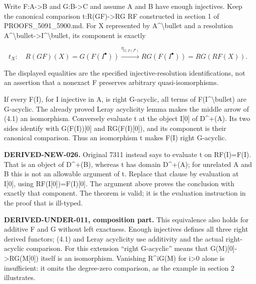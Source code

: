 \documentclass[11pt]{article}
\begin{document}
Write F:\allowbreak{}A\allowbreak{}->B and G:\allowbreak{}B\allowbreak{}->C and assume A and B have enough injectives. Keep the canonical comparison t:\allowbreak{}R(GF)\allowbreak{}\allowbreak{}->RG RF constructed in section 1 of PROOFS\_\allowbreak{}5091\_\allowbreak{}5900.md. For X represented by A\^{}\textbackslash bullet and a resolution A\textasciicircum{}\textbackslash{}bullet\allowbreak{}->I\textasciicircum{}\textbackslash{}bullet,\allowbreak{} its component is exactly

\[
 t_X:\quad
 R(GF)(X)=G(F(I^\bullet))
       \xrightarrow{\eta_{G,F(I^\bullet)}}RG(F(I^\bullet))
       =RG(RF(X)).                                            \tag{4.1}
\]

The displayed equalities are the specified injective-resolution identifications,\allowbreak{} not an assertion that a nonexact F preserves arbitrary quasi-isomorphisms.

If every F(I)\allowbreak{},\allowbreak{} for I injective in A,\allowbreak{} is right G-acyclic,\allowbreak{} all terms of F(I\textasciicircum{}\textbackslash{}bullet)\allowbreak{} are G-acyclic. The already proved Leray acyclicity lemma makes the middle arrow of (4.1)\allowbreak{} an isomorphism. Conversely evaluate t at the object I[0]\allowbreak{} of D\textasciicircum{}\allowbreak{}+(A)\allowbreak{}. Its two sides identify with G(F(I)\allowbreak{})\allowbreak{}[0]\allowbreak{} and RG(F(I)\allowbreak{}[0]\allowbreak{})\allowbreak{},\allowbreak{} and its component is their canonical comparison. Thus an isomorphism t makes F(I)\allowbreak{} right G-acyclic.

\textbf{DERIVED-NEW-026.} Original 7311 instead says to evaluate t on RF(I)\allowbreak{}\allowbreak{}=F(I)\allowbreak{}. That is an object of D\textasciicircum{}\allowbreak{}+(B)\allowbreak{},\allowbreak{} whereas t has domain D\textasciicircum{}\allowbreak{}+(A)\allowbreak{}; for unrelated A and B this is not an allowable argument of t. Replace that clause by evaluation at I[0]\allowbreak{},\allowbreak{} using RF(I[0]\allowbreak{})\allowbreak{}\allowbreak{}=F(I)\allowbreak{}[0]\allowbreak{}. The argument above proves the conclusion with exactly that component. The theorem is valid; it is the evaluation instruction in the proof that is ill-typed.

\textbf{DERIVED-UNDER-011,\allowbreak{} composition part.} This equivalence also holds for additive F and G without left exactness. Enough injectives defines all three right derived functors; (4.1)\allowbreak{} and Leray acyclicity use additivity and the actual right-acyclic comparison. For this extension ``right G-acyclic'' means that G(M)\allowbreak{}[0]\allowbreak{}\allowbreak{}->RG(M[0]\allowbreak{})\allowbreak{} itself is an isomorphism. Vanishing R\textasciicircum{}iG(M)\allowbreak{} for i\textgreater0 alone is insufficient:\allowbreak{} it omits the degree-zero comparison,\allowbreak{} as the example in section 2 illustrates.
\end{document}
